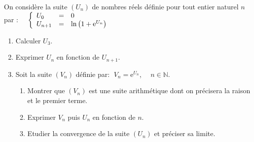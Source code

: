 \begin{exercice}
On considère la suite $\left(U_n\right)$ de nombres réels  définie pour tout entier naturel $n$ par : 
$\quad\left\{\begin{array}{l c l}
U_0		& =& 0\\
U_{n+1}& =& \ln\left(1+\text{e}^{U_n}\right)
\end{array}\right.$
 \begin{enumerate}
\item Calculer  $ U_3$.
\item Exprimer $ U_{n} $ en fonction de  $ U_{n+1} $.
\item Soit la suite  $\left(V_n\right)$ définie par: \; $\; V_n= \text{e}^{U_n}$, $\quad n\in\mathbb{N} $.
\begin{enumerate}
\item  Montrer que  $ ( V_n )$ est une suite arithmétique  dont on précisera la  raison et le premier terme.
\item Exprimer $  V_n $  puis  $  U_n $  en fonction de $ n. $ 
\item Etudier la convergence de la suite $ ( U_n) $ et préciser sa limite.
 \end{enumerate} 

  \end{enumerate}
\end{exercice}


